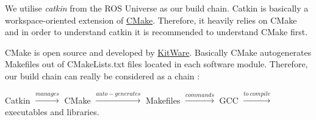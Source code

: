 We utilise \emph{catkin} from the ROS Universe as our build chain. Catkin is basically a workspace-oriented extension of \href{http://www.cmake.org/}{CMake}. Therefore, it heavily relies on CMake and in order to understand catkin it is recommended to understand CMake first.

CMake is open source and developed by \href{http://www.kitware.com/company/about.html}{KitWare}. Basically CMake autogenerates Makefiles out of CMakeLists.txt files located in each software module. Therefore, our build chain can really be considered as a chain \smiley: 

Catkin $\xrightarrow{manages}$ CMake $\xrightarrow{auto-generates}$ Makefiles $\xrightarrow{commands}$ GCC $\xrightarrow{to\ compile}$ executables and libraries.
